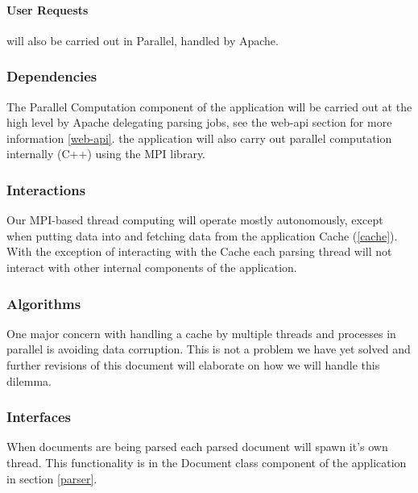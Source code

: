 \paragraph{User Requests} will also be carried out in Parallel, handled by Apache.

\subsubsection{Dependencies}

The Parallel Computation component of the application will be carried out at the high level by Apache delegating parsing jobs, see the \gls{web-api} section for more information \ref{web-api}.
the application will also carry out parallel computation internally (C++) using the MPI library.

\subsubsection{Interactions}

Our MPI-based thread computing will operate mostly autonomously, except when putting data into and fetching data from the application Cache (\ref{cache}).
With the exception of interacting with the Cache each parsing thread will not interact with other internal components of the application.

\subsubsection{Algorithms}

One major concern with handling a cache by multiple threads and processes in parallel is avoiding data corruption.
This is not a problem we have yet solved and further revisions of this document will elaborate on how we will handle this dilemma.

\subsubsection{Interfaces}

When documents are being parsed each parsed document will spawn it's own thread.
This functionality is in the Document class component of the application in section \ref{parser}.

